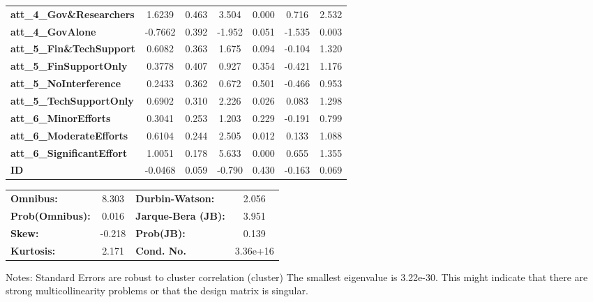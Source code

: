 \begin{center}
\begin{tabular}{lcccccc}
\textbf{att\_4\_Gov\&Researchers}           &       1.6239  &        0.463     &     3.504  &         0.000        &        0.716    &        2.532     \\
\textbf{att\_4\_GovAlone}                   &      -0.7662  &        0.392     &    -1.952  &         0.051        &       -1.535    &        0.003     \\
\textbf{att\_5\_Fin\&TechSupport}           &       0.6082  &        0.363     &     1.675  &         0.094        &       -0.104    &        1.320     \\
\textbf{att\_5\_FinSupportOnly}             &       0.3778  &        0.407     &     0.927  &         0.354        &       -0.421    &        1.176     \\
\textbf{att\_5\_NoInterference}             &       0.2433  &        0.362     &     0.672  &         0.501        &       -0.466    &        0.953     \\
\textbf{att\_5\_TechSupportOnly}            &       0.6902  &        0.310     &     2.226  &         0.026        &        0.083    &        1.298     \\
\textbf{att\_6\_MinorEfforts}               &       0.3041  &        0.253     &     1.203  &         0.229        &       -0.191    &        0.799     \\
\textbf{att\_6\_ModerateEfforts}            &       0.6104  &        0.244     &     2.505  &         0.012        &        0.133    &        1.088     \\
\textbf{att\_6\_SignificantEffort}          &       1.0051  &        0.178     &     5.633  &         0.000        &        0.655    &        1.355     \\
\textbf{ID}                                 &      -0.0468  &        0.059     &    -0.790  &         0.430        &       -0.163    &        0.069     \\
\bottomrule
\end{tabular}
\begin{tabular}{lclc}
\textbf{Omnibus:}       &  8.303 & \textbf{  Durbin-Watson:     } &    2.056  \\
\textbf{Prob(Omnibus):} &  0.016 & \textbf{  Jarque-Bera (JB):  } &    3.951  \\
\textbf{Skew:}          & -0.218 & \textbf{  Prob(JB):          } &    0.139  \\
\textbf{Kurtosis:}      &  2.171 & \textbf{  Cond. No.          } & 3.36e+16  \\
\bottomrule
\end{tabular}
\end{center}

Notes: \newline
 [1] Standard Errors are robust to cluster correlation (cluster) \newline
 [2] The smallest eigenvalue is 3.22e-30. This might indicate that there are \newline
 strong multicollinearity problems or that the design matrix is singular.